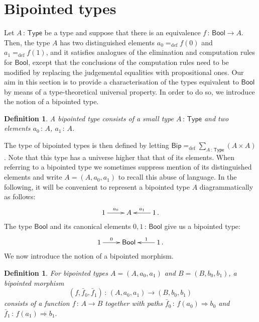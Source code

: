 \documentclass[10pt,a4paper,oneside,reqno]{amsart}
\theoremstyle{mythm}
\theoremstyle{mydef}
\newtheorem{definition}[theorem]{Definition}
\theoremstyle{myrmk}
\newcommand{\defeq}{=_{\mathrm{def}}}
\newcommand{\co}{\,{:}\,}
\newcommand{\Bool}{\mathsf{Bool}}
\newcommand{\U}{\mathsf{Type}}
\newcommand{\Bip}{\mathsf{Bip}}
\begin{document}
\newpage

\section{Bipointed types}
\label{sec:bip}



Let $A \co \U$ be a type and suppose that there is an equivalence $f \co \Bool \to A$. Then, the type $A$ 
has two distinguished elements $a_0 \defeq f(0)$ and $a_1 \defeq f(1)$, and it satisfies
analogues of the elimination and computation rules for $\Bool$, except that the conclusions of the computation 
rules need to be modified  by replacing the judgemental equalities  with propositional ones. Our aim in this section is to provide a characterisation of the types equivalent to $\Bool$ by means of a type-theoretical universal property. In order to do so, we introduce the notion of a bipointed type. 


\begin{definition} \label{thm:bipointedtype}
A \emph{bipointed type} consists of a small type $A \co \U$ and two elements 
$a_0 \co A$, $a_1 \co A$.
\end{definition}

The type of bipointed types is then defined by letting $\Bip \defeq \sum_ {A \co \U}( A \times A )$. 
Note that this type has a universe higher that that of its elements. 
When referring to a bipointed type we sometimes suppress mention of its distinguished elements and write $A = (A, a_0, a_1)$ to
recall this abuse of language.  In the following, it will be convenient to represent a bipointed type $A$ diagrammatically as follows:
\[
\xymatrix{
 1 \ar[r]^-{a_0}&  A & 1 \ar[l]_-{a_1} \, .}
 \]
The type $\Bool$ and its canonical elements $0, 1 \co \Bool$ give us a bipointed type:
\[
\xymatrix{
 1 \ar[r]^-{0}&  \Bool  & 1 \ar[l]_-{1} \, . }
 \]
We now introduce the notion of a bipointed morphism.

\begin{definition} For bipointed types $A = (A, a_0, a_1)$ and $B = (B, b_0, b_1)$, a \emph{bipointed morphism} 
\[
(f, \bar{f}_0, \bar{f}_1)  \co (A, a_0, a_1)  \to (B, b_0, b_1)
\] 
consists of a function $f \co A \to B$ together with paths $\bar{f}_0 \co  f(a_0) \Rightarrow b_0$ 
and~$\bar{f}_1 \co f(a_1) \Rightarrow b_1$.  \end{definition}
\end{document}
